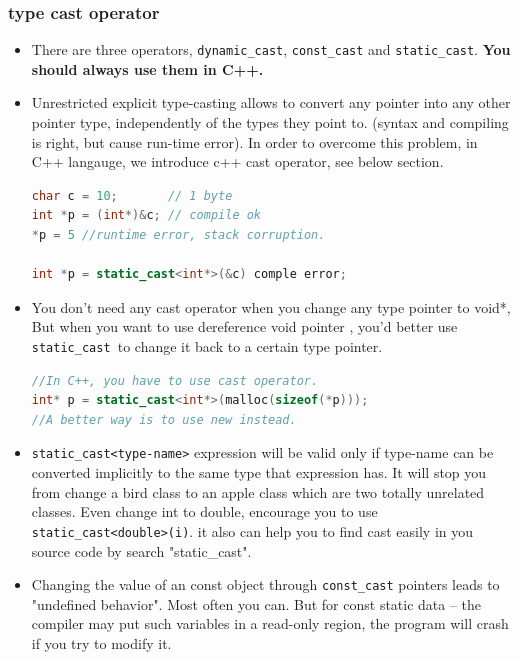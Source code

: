 \documentclass[a4paper,12pt,twoside]{book}
\begin{document}
\subsubsection{type cast operator}
\begin{itemize}
\item There are three operators, \texttt{dynamic\_cast}, \texttt{const\_cast} and \texttt{static\_cast}. \textbf{You should always use them in C++.}

\item Unrestricted explicit type-casting allows to convert any pointer into any other pointer type, independently of the types they point to.  (syntax and compiling is right, but cause run-time error). In order to overcome this problem,  in C++ langauge, we introduce c++ cast operator, see below section.
\begin{lstlisting}[frame=single, language=c++]
char c = 10;       // 1 byte
int *p = (int*)&c; // compile ok
*p = 5 //runtime error, stack corruption.

int *p = static_cast<int*>(&c) comple error;
\end{lstlisting}

\item You don't need any cast operator when you change any type pointer to void*, But when you want to use dereference void pointer , you'd better use \texttt{static\_cast }to change it back to a certain type pointer.
\begin{lstlisting}[frame=single, language=c++]
//In C++, you have to use cast operator.
int* p = static_cast<int*>(malloc(sizeof(*p)));
//A better way is to use new instead.
\end{lstlisting}

\item    \texttt{static\_cast<type-name>} expression will be valid only if type-name can be converted implicitly to the same type that expression has.  It will stop you from change a bird class to an apple class which  are two totally unrelated classes.  Even change int to double, encourage you to use \texttt{static\_cast<double>(i)}.  it also can help you to find cast easily in you source code by search "static\_cast".

\item Changing the value of an const object through \texttt{const\_cast} pointers leads to  "undefined behavior". Most often you can. But for const static data -- the compiler may put such variables in a read-only region, the program will crash if you try to modify it.


\end{itemize}
\end{document}
